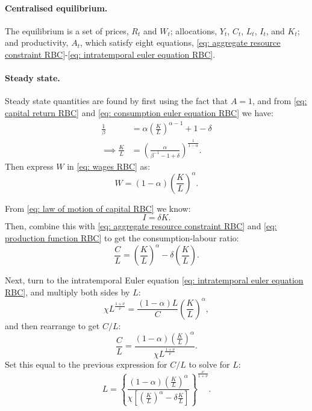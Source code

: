 \documentclass[12pt,english]{extarticle}
\begin{document}
	\paragraph{Centralised equilibrium.} The equilibrium is a set of prices, $R_t$ and $W_t$; allocations, $Y_t$, $C_t$, $L_t$, $I_t$, and $K_t$; and productivity, $A_t$, which satisfy eight equations, \eqref{eq: aggregate resource constraint RBC}-\eqref{eq: intratemporal euler equation RBC}.
	
	\paragraph{Steady state.} Steady state quantities are found by first using the fact that $A=1$, and from \eqref{eq: capital return RBC} and \eqref{eq: consumption euler equation RBC} we have:
	\begin{equation*}
		\begin{split}
			\frac{1}{\beta} &= \alpha\left(\frac{K}{L}\right)^{\alpha-1} + 1 - \delta \\
			\implies \frac{K}{L} &= \left(\frac{\alpha}{\beta^{-1}-1+\delta}\right)^{\frac{1}{1-\alpha}}.
		\end{split}
	\end{equation*}
	Then express $W$ in \eqref{eq: wages RBC} as:
	\begin{equation*}
		W = (1-\alpha)\left(\frac{K}{L}\right)^\alpha.
	\end{equation*}
	
	From \eqref{eq: law of motion of capital RBC} we know:
	\begin{equation*}
		I = \delta K.
	\end{equation*}
	Then, combine this with \eqref{eq: aggregate resource constraint RBC} and \eqref{eq: production function RBC} to get the consumption-labour ratio:
	\begin{equation*}
		\frac{C}{L} = \left(\frac{K}{L}\right)^\alpha - \delta\left(\frac{K}{L}\right).
	\end{equation*}
	
	Next, turn to the intratemporal Euler equation \eqref{eq: intratemporal euler equation RBC}, and multiply both sides by $L$:
	\begin{equation*}
		\chi L^{\frac{1+\nu}{\nu}} = \frac{(1-\alpha)L}{C}\left(\frac{K}{L}\right)^\alpha,
	\end{equation*}
	and then rearrange to get $C/L$:
	\begin{equation*}
		\frac{C}{L} = \frac{(1-\alpha)\left(\frac{K}{L}\right)^\alpha}{\chi L^{\frac{1+\nu}{\nu}}}.
	\end{equation*}
	Set this equal to the previous expression for $C/L$ to solve for $L$:
	\begin{equation*}
		L = \left\{\frac{(1-\alpha)\left(\frac{K}{L}\right)^\alpha}{\chi\left[\left(\frac{K}{L}\right)^\alpha - \delta\frac{K}{L}\right]}\right\}^{\frac{\nu}{1+\nu}}.
	\end{equation*}
	
\end{document}
